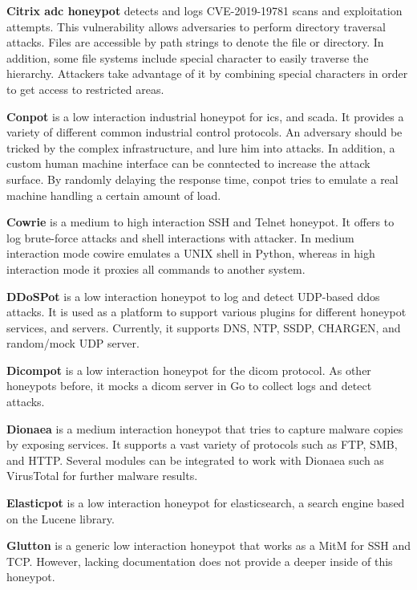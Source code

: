\textbf{Citrix \ac{adc} honeypot} \cite{citrixhoneypot2020} detects and logs CVE-2019-19781\cite{CVE-2019-19781} scans and exploitation attempts.
This vulnerability allows adversaries to perform directory traversal attacks.
Files are accessible by path strings to denote the file or directory.
In addition, some file systems include special character to easily traverse the hierarchy.
Attackers take advantage of it by combining special characters in order to get access to restricted areas. \cite{flanders2019}

\textbf{Conpot} \cite{conpot2021} is a low interaction industrial honeypot for \ac{ics}, and \ac{scada}.
It provides a variety of different common industrial control protocols.
An adversary should be tricked by the complex infrastructure, and lure him into attacks.
In addition, a custom human machine interface can be conntected to increase the attack surface.
By randomly delaying the response time, conpot tries to emulate a real machine handling a certain amount of load.

\textbf{Cowrie} \cite{cowire2021} is a medium to high interaction SSH and Telnet honeypot.
It offers to log brute-force attacks and shell interactions with attacker.
In medium interaction mode cowire emulates a UNIX shell in Python, whereas in high interaction mode it proxies all commands to another system.

\textbf{DDoSPot} \cite{ddosspot2021} is a low interaction honeypot to log and detect UDP-based \ac{ddos} attacks.
It is used as a platform to support various plugins for different honeypot services, and servers.
Currently, it supports DNS, NTP, SSDP, CHARGEN, and random/mock UDP server.

\textbf{Dicompot} \cite{dicompot2021} is a low interaction honeypot for the \ac{dicom} protocol.
As other honeypots before, it mocks a \ac{dicom} server in Go to collect logs and detect attacks.

\textbf{Dionaea} \cite{dionaea2021} is a medium interaction honeypot that tries to capture malware copies by exposing services.
It supports a vast variety of protocols such as FTP, SMB, and HTTP.
Several modules can be integrated to work with Dionaea such as VirusTotal for further malware results.

\textbf{Elasticpot} \cite{elasticpot2021} is a low interaction honeypot for elasticsearch, a search engine based on the Lucene library.

\textbf{Glutton} \cite{glutton2021} is a generic low interaction honeypot that works as a MitM for SSH and TCP.
However, lacking documentation does not provide a deeper inside of this honeypot.

